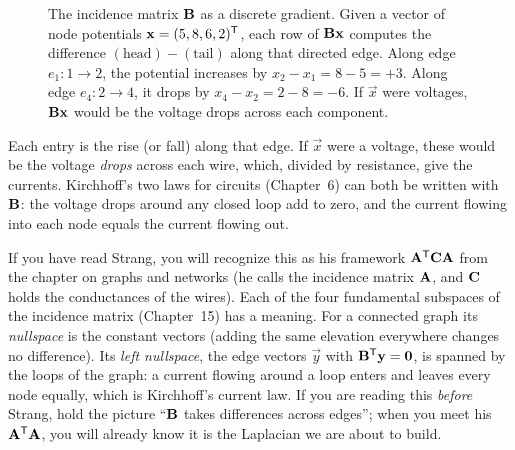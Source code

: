 \begin{figure}[H]
\centering
{}
\caption{The incidence matrix $\mathbf{B}$ as a discrete gradient. Given a vector of node
potentials $\mathbf{x}=(5,8,6,2)^{\mathsf{T}}$, each row of $\mathbf{B}\mathbf{x}$ computes the difference
$(\text{head}) - (\text{tail})$ along that directed edge. Along edge $e_1: 1 \to 2$, the
potential increases by $x_2 - x_1 = 8 - 5 = +3$. Along edge $e_4: 2 \to 4$, it drops by
$x_4 - x_2 = 2 - 8 = -6$. If $\vec{x}$ were voltages, $\mathbf{B}\mathbf{x}$ would be the voltage
drops across each component.}
\label{ch35:fig-gradient}
\end{figure}

Each entry is the rise (or fall) along that edge. If $\vec{x}$ were a voltage, these would
be the voltage \emph{drops} across each wire, which, divided by resistance, give the
currents. Kirchhoff's two laws for circuits (Chapter~6) can both be written with
$\mathbf{B}$: the voltage drops around any closed loop add to zero, and the current flowing
into each node equals the current flowing out.

\begin{strangbox}
If you have read Strang, you will recognize this as his framework
$\mathbf{A}^{\mathsf{T}} \mathbf{C} \mathbf{A}$ from the chapter on graphs and networks (he calls the incidence
matrix $\mathbf{A}$, and $\mathbf{C}$ holds the conductances of the wires). Each of the four
fundamental subspaces of the incidence matrix (Chapter~15) has a meaning. For a connected
graph its \emph{nullspace} is the constant vectors (adding the same elevation everywhere
changes no difference). Its \emph{left nullspace}, the edge vectors $\vec y$ with
$\mathbf{B}^{\mathsf{T}}\mathbf{y} = \mathbf{0}$, is spanned by the loops of the graph: a current flowing around a
loop enters and leaves every node equally, which is Kirchhoff's current law. If you are
reading this \emph{before} Strang, hold the picture ``$\mathbf{B}$ takes differences across
edges''; when you meet his $\mathbf{A}^{\mathsf{T}} \mathbf{A}$, you will already know it is the Laplacian
we are about to build.
\end{strangbox}

